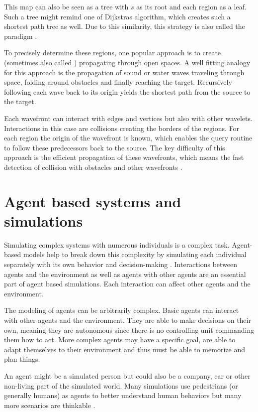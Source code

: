		This map can also be seen as a tree with $s$ as its root and each region as a leaf.
		Such a tree might remind one of Dijkstras algorithm, which creates such a shortest path tree as well.
		Due to this similarity, this strategy is also called the  paradigm \cite{mitchell-discrete-geodesic}.
		
		To precisely determine these regions, one popular approach is to create  (sometimes also called ) propagating through open spaces.
		A well fitting analogy for this approach is the propagation of sound or water waves traveling through space, folding around obstacles and finally reaching the target.
		Recursively following each wave back to its origin yields the shortest path from the source to the target.
		
		Each wavefront can interact with edges and vertices but also with other wavelets.
		Interactions in this case are collisions creating the borders of the regions.
		For each region the origin of the wavefront is known, which enables the query routine to follow these predecessors back to the source.
		The key difficulty of this approach is the efficient propagation of these wavefronts, which means the fast detection of collision with obstacles and other wavefronts \cite{hershberger-suri}.

\section{Agent based systems and simulations}

	Simulating complex systems with numerous individuals is a complex task.
	Agent-based models help to break down this complexity by simulating each individual separately with its own behavior and decision-making \cite{macal-introductory-tutorial}.
	Interactions between agents and the environment as well as agents with other agents are an essential part of agent based simulations.
	Each interaction can affect other agents and the environment.
	
	The modeling of agents can be arbitrarily complex.
	Basic agents can interact with other agents and the environment.
	They are able to make decisions on their own, meaning they are autonomous since there is no controlling unit commanding them how to act.
	More complex agents may have a specific goal, are able to adapt themselves to their environment and thus must be able to memorize and plan things.
	
	An agent might be a simulated person but could also be a company, car or other non-living part of the simulated world.
	Many simulations use pedestrians (or generally humans) as agents to better understand human behaviors but many more scenarios are thinkable \cite{macal-introductory-tutorial}.

